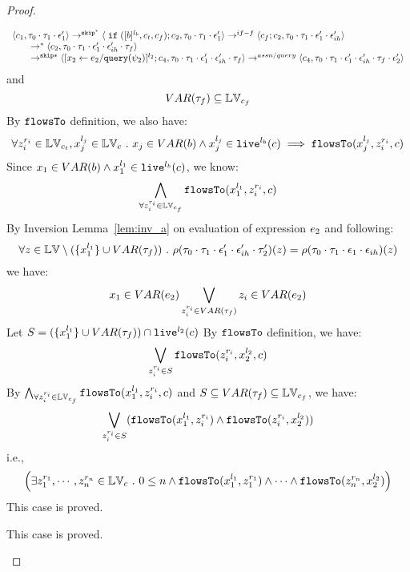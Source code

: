 \begin{proof}
\begin{case}[$\trace_2 = \trace_{ih} \cdot \event_{ih}$]
\begin{subcase}
\begin{subsubcase}
\begin{subproof}
\begin{enumerate}
\begin{enumerate}
\[\begin{array}{l}
  \langle c_1, \mathtt{\tau}_0 \cdot \mathtt{\tau}_1 \cdot \mathtt{\epsilon}_1' \rangle 
  \rightarrow^{\mathtt{skip}^*} 
  \langle \;\mathtt{if}\; ([b]^{l_b}, c_t, c_f); {c}_2, \mathtt{\tau}_0 \cdot \mathtt{\tau}_1 \cdot \mathtt{\epsilon}_1' \rangle 
  \rightarrow^{if-f} 
  \langle c_f;c_2, \mathtt{\tau}_0 \cdot \mathtt{\tau}_1 \cdot \mathtt{\epsilon}_1' \cdot \mathtt{\epsilon}_{ih}' \rangle 
  \\
  \qquad \rightarrow^{*} 
  \langle c_2, 
  \mathtt{\tau}_0 \cdot \mathtt{\tau}_1 \cdot \mathtt{\epsilon}_1' \cdot \mathtt{\epsilon}_{ih}' \cdot \mathtt{\tau}_f \rangle
  \\
  \qquad \rightarrow^{\mathtt{skip}*} 
  \langle [\mathrel{ {x}_2 \leftarrow e_2 / {\tt query}(\psi_2) }]^{l_2};{c}_4, 
  \mathtt{\tau}_0 \cdot \mathtt{\tau}_1 \cdot \mathtt{\epsilon}_1' \cdot \mathtt{\epsilon}_{ih}' \cdot \mathtt{\tau}_f \rangle
  \rightarrow^{assn/query} 
  \langle {c}_4,  \mathtt{\tau}_0 \cdot \mathtt{\tau}_1 \cdot \mathtt{\epsilon}_1' \cdot \mathtt{\epsilon}_{ih}' \cdot \mathtt{\tau}_f \cdot \mathtt{\epsilon}_2' \rangle 
\end{array}
\]
and 
\[
  VAR{(\mathtt{\tau}_f)} \subseteq \mathbb{LV}_{c_f}
\]
%
By $\mathtt{flowsTo}$ definition, we also have:
\[
  \forall z_i^{r_i} \in \mathbb{LV}_{c_t},  x_j^{l_j} \in \mathbb{LV}_c ~.~ 
  x_j \in VAR(b) \land x_j^{l_j} \in \mathtt{live}^{l_b}(c) \implies
  \mathtt{flowsTo}(x_j^{l_j}, z_i^{r_i}, c)
\]
Since $x_1 \in VAR(b) \land x_1^{l_1} \in \mathtt{live}^{l_b}(c)$, we know: 
\[
  \bigwedge_{\forall z_i^{r_i} \in \mathbb{LV}_{c_f}}
  \mathtt{flowsTo}(x_1^{l_1}, z_i^{r_i}, c)
\]
%
By Inversion Lemma~\ref{lem:inv_a} on evaluation of expression $e_2$ and following: 
\[
  \forall z \in \mathbb{LV} \setminus (\{x_1^{l_1}\} \cup VAR{(\mathtt{\tau}_f)}) ~.~
  \rho(\mathtt{\tau}_0 \cdot \mathtt{\tau}_1 \cdot \mathtt{\epsilon}_1'\cdot \mathtt{\epsilon}_{ih}' \cdot \mathtt{\tau}_2')(z) 
  = \rho(\mathtt{\tau}_0 \cdot \mathtt{\tau}_1 \cdot \mathtt{\epsilon}_1\cdot \mathtt{\epsilon}_{ih})(z)
\]
%
we have:
\[
  x_1 \in VAR(e_2) \bigvee_{z_i^{r_i} \in VAR{(\mathtt{\tau}_f)}} z_i \in VAR(e_2)
\]
%
Let $S = (\{x_1^{l_1}\} \cup VAR{(\mathtt{\tau}_f)}) \cap \mathtt{live}^{l_2}(c) $
%
By $\mathtt{flowsTo}$ definition, we have:
\[
   \bigvee_{z_i^{r_i} \in S}  \mathtt{flowsTo}(z_i^{r_i}, x_2^{l_2}, c)
\]
By $ \bigwedge_{\forall z_i^{r_i} \in \mathbb{LV}_{c_f}} \mathtt{flowsTo}(x_1^{l_1}, z_i^{r_i}, c)$ and $S \subseteq VAR{(\mathtt{\tau}_f)} \subseteq \mathbb{LV}_{c_f}$, we have:
\[
\bigvee_{z_i^{r_i} \in S} 
(\mathtt{flowsTo}(x_1^{l_1}, z_i^{r_i}) \land \mathtt{flowsTo}(z_i^{r_i}, x_2^{l_2}))
\]
%
i.e.,
\[
\Big(\exists z_1^{r_1}, \cdots, z_n^{r_n} \in \mathbb{LV}_{{c}} ~.~ 0 \leq n 
 \land \mathtt{flowsTo}(x_1^{l_1}, z_1^{r_1}) \land \cdots \land \mathtt{flowsTo}(z_n^{r_n}, {x}_2^{l_2}) \Big)
\]
%
This case is proved.
\end{enumerate}
%
\end{enumerate}
%
This case is proved.
\end{subproof}

\end{subsubcase}
\end{subcase}
\end{case}
\end{proof}
